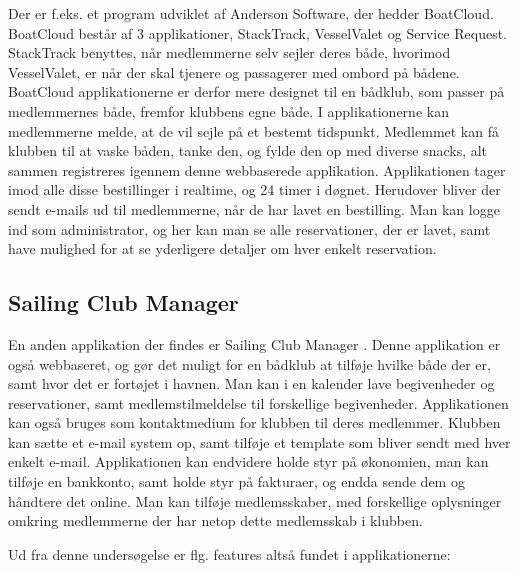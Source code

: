Der er f.eks. et program udviklet af Anderson Software, der hedder BoatCloud.\citep{BoatCloud} BoatCloud
består af 3 applikationer, StackTrack, VesselValet og Service Request.  StackTrack benyttes, når medlemmerne selv sejler deres både, hvorimod VesselValet, er
når der skal tjenere og passagerer med ombord på bådene. BoatCloud applikationerne er derfor mere designet til
en bådklub, som passer på medlemmernes både, fremfor klubbens egne både. I applikationerne kan medlemmerne
melde, at de vil sejle på et bestemt tidspunkt. Medlemmet kan få klubben til at vaske båden, tanke den, og
fylde den op med diverse snacks, alt sammen registreres igennem denne webbaserede applikation. Applikationen
tager imod alle disse bestillinger i realtime, og 24 timer i døgnet. Herudover bliver der sendt e-mails ud til
medlemmerne, når de har lavet en bestilling. Man kan logge ind som administrator, og her kan man se alle
reservationer, der er lavet, samt have mulighed for at se yderligere detaljer om hver enkelt reservation.


\subsection*{Sailing Club Manager}

En anden applikation der findes er Sailing Club Manager \citep{SailClub}. Denne applikation er også
webbaseret, og gør det muligt for en bådklub at tilføje hvilke både der er, samt hvor det er fortøjet i
havnen. Man kan i en kalender lave begivenheder og reservationer, samt medlemstilmeldelse til forskellige
begivenheder. Applikationen kan også bruges som kontaktmedium for klubben til deres medlemmer. Klubben kan
sætte et e-mail system op, samt tilføje et template som bliver sendt med hver enkelt e-mail. Applikationen kan
endvidere holde styr på økonomien, man kan tilføje en bankkonto, samt  holde styr på fakturaer, og endda sende
dem og håndtere det online. Man kan tilføje medlemsskaber, med forskellige oplysninger omkring medlemmerne der
har netop dette medlemsskab i klubben.

Ud fra denne undersøgelse er flg. features altså fundet i applikationerne:

